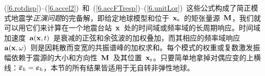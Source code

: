 (\ref{6.rotdisp})--(\ref{6.accel2})~和~(\ref{6.accFTresp})--(\ref{6.unitLor})~这些公式构成了简正模式地震学{\em 正演问题\/}的完备解，即给定地球模型和位于~$\mbox{${\bf x}$}_{\rm s}$~的矩张量源~$\mbox{${\bf M}$}$，我们就可以用它们来计算在一个地震台站~$\mbox{${\bf x}$}$~处的时间域或频率域的长周期响应。时间域加速度~$\mbox{${\bf a}$}(\mbox{${\bf x}$},t)$~是衰减的正弦和余弦波的加权叠加，而其相应的频率域响应~$\mbox{${\bf a}$}(\mbox{${\bf x}$},\omega)$~则是因耗散而变宽的共振谱峰的加权求和。每个模式的权重或复数激发振幅依赖于震源的大小和方向性~$\mbox{${\bf M}$}$~及其位置~$\mbox{${\bf x}$}_{\rm s}$。只要简单地拿掉对偶应变的上横线：$\overline{\mbox{\boldmath $\bf \varepsilon$}}_k=\mbox{\boldmath $\bf \varepsilon$}_k$，本节的所有结果皆适用于无自转非弹性地球。
%
%
%
%
